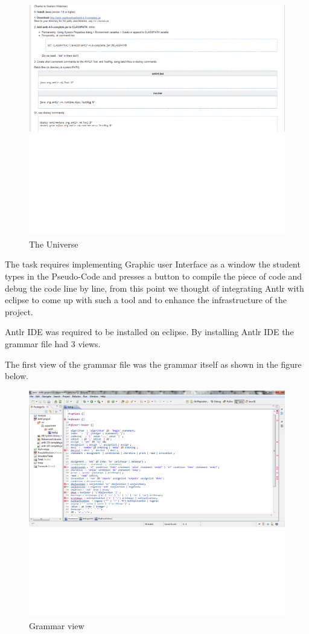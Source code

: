 \documentclass[a4paper]{article}
\begin{document}
\begin{figure}[h!]
\centering
\includegraphics{report1.png}
\caption{The Universe}
\label{threadsVsSync}
\end{figure}
 
The task requires implementing Graphic user Interface as a window the student types in the Pseudo-Code and presses a button to compile the piece of code and debug the code line by line, from this point we thought of integrating Antlr with eclipse to come up with such a tool and to enhance the infrastructure of the project.

Antlr IDE was required to be installed on eclipse. By installing Antlr IDE the grammar file had 3 views.

The first view of the grammar file was the grammar itself as shown in the figure below.
\begin{figure}[h!]
\centering
\includegraphics{report2.png}
\caption{Grammar view}
\label{threadsVsSync}
\end{figure}
\end{document}

